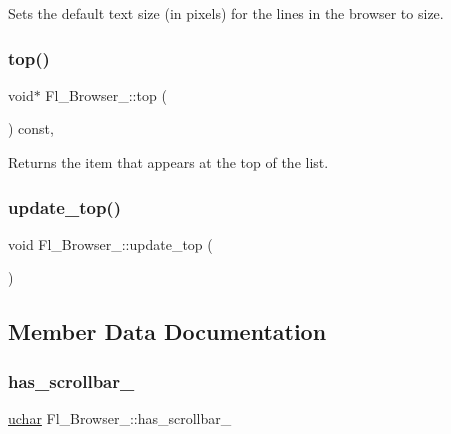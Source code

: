 Sets the default text size (in pixels) for the lines in the browser to {\ttfamily size}. \mbox{\label{class_fl___browser___acf8856ddf092e7b00d9f6b381cc09b20}} 
\subsubsection{\texorpdfstring{top()}{top()}}
{\footnotesize\ttfamily void$\ast$ Fl\+\_\+\+Browser\+\_\+\+::top (\begin{DoxyParamCaption}{ }\end{DoxyParamCaption}) const\hspace{0.3cm}{\ttfamily [inline]}, {\ttfamily [protected]}}

Returns the item that appears at the top of the list. \mbox{\label{class_fl___browser___a122a2aa4ad005096b627f80522b4af30}} 
\subsubsection{\texorpdfstring{update\+\_\+top()}{update\_top()}}
{\footnotesize\ttfamily void Fl\+\_\+\+Browser\+\_\+\+::update\+\_\+top (\begin{DoxyParamCaption}{ }\end{DoxyParamCaption})\hspace{0.3cm}{\ttfamily [private]}}



\subsection{Member Data Documentation}
\mbox{\label{class_fl___browser___aeaeeb512d94e2f1d1e0cabdf371fa484}} 
\subsubsection{\texorpdfstring{has\+\_\+scrollbar\+\_\+}{has\_scrollbar\_}}
{\footnotesize\ttfamily \hyperlink{fl__types_8h_a65f85814a8290f9797005d3b28e7e5fc}{uchar} Fl\+\_\+\+Browser\+\_\+\+::has\+\_\+scrollbar\+\_\+\hspace{0.3cm}{\ttfamily [private]}}

